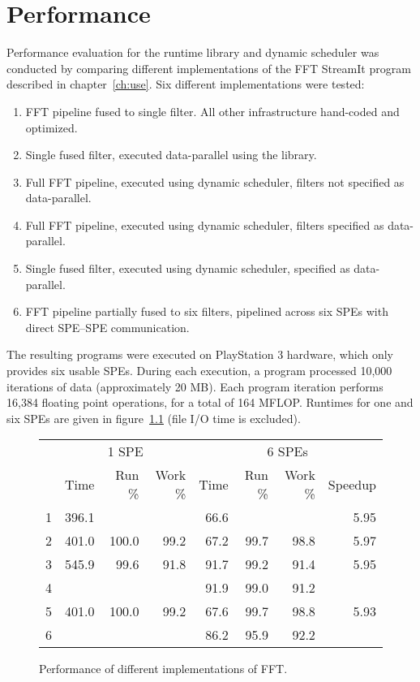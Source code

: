 \chapter{Performance}\label{ch:perf}

Performance evaluation for the runtime library and dynamic scheduler was conducted by comparing different implementations of the FFT StreamIt program described in chapter~\ref{ch:use}. Six different implementations were tested:
\begin{enumerate}
\item FFT pipeline fused to single filter. All other infrastructure hand-coded and optimized.
\item Single fused filter, executed data-parallel using the library.
\item Full FFT pipeline, executed using dynamic scheduler, filters not specified as data-parallel.
\item Full FFT pipeline, executed using dynamic scheduler, filters specified as data-parallel.
\item Single fused filter, executed using dynamic scheduler, specified as data-parallel.
\item FFT pipeline partially fused to six filters, pipelined across six SPEs with direct SPE--SPE communication.
\end{enumerate}

The resulting programs were executed on PlayStation 3 hardware, which only provides six usable SPEs. During each execution, a program processed 10,000 iterations of data (approximately 20 MB). Each program iteration performs 16,384 floating point operations, for a total of 164 MFLOP. Runtimes for one and six SPEs are given in figure~\ref{fig:perf:fft} (file I/O time is excluded).

\begin{figure}[!htb]
\begin{center}
\begin{tabular}{|r|r|r|r|r|r|r|r|}
\hline
& \multicolumn{3}{|c|}{1 SPE} & \multicolumn{4}{|c|}{6 SPEs} \\
\cline{2-8}
& Time & Run \% & Work \% & Time & Run \% & Work \% & Speedup \\
\hline
\textsf{1} & 396.1 & \multicolumn{2}{|c|}{} & 66.6 & \multicolumn{2}{|c|}{} & 5.95 \\
\hline
\textsf{2} & 401.0 & 100.0 & 99.2 & 67.2 & 99.7 & 98.8 & 5.97 \\
\hline
\textsf{3} & 545.9 & 99.6 & 91.8 & 91.7 & 99.2 & 91.4 & 5.95 \\
\hline
\textsf{4} & \multicolumn{3}{|c|}{} & 91.9 & 99.0 & 91.2 & \\
\hline
\textsf{5} & 401.0 & 100.0 & 99.2 & 67.6 & 99.7 & 98.8 & 5.93 \\
\hline
\textsf{6} & \multicolumn{3}{|c|}{} & 86.2 & 95.9 & 92.2 & \\
\hline
\end{tabular}
\end{center}
\caption{Performance of different implementations of FFT.}
\label{fig:perf:fft}
\end{figure}

